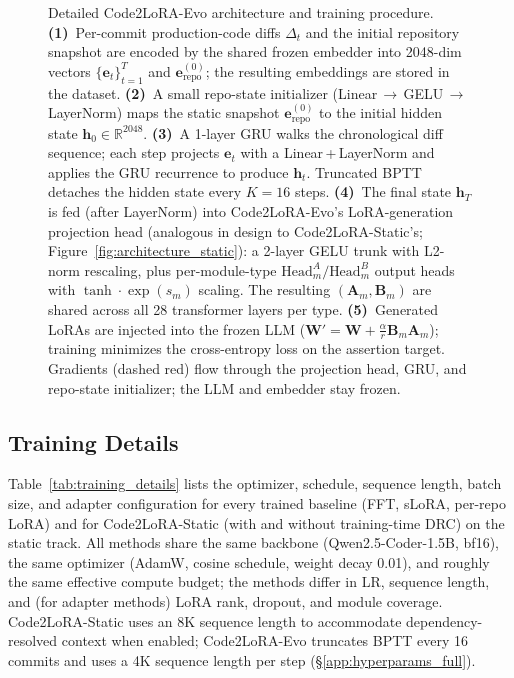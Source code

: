 \documentclass[11pt]{article}
\newcommand{\codelora}{Code2LoRA\xspace}
\newcommand{\codelorastatic}{\codelora-Static\xspace}
\newcommand{\codeloraevo}{\codelora-Evo\xspace}
\begin{document}
\begin{figure}[t]
\begin{center}
\caption{Detailed \codeloraevo{} architecture and training procedure.
\textbf{(1)}~Per-commit production-code diffs $\Delta_t$ and the initial repository snapshot are encoded by the shared frozen embedder into 2048-dim vectors $\{\mathbf{e}_t\}_{t=1}^T$ and $\mathbf{e}_{\text{repo}}^{(0)}$; the resulting embeddings are stored in the dataset.
\textbf{(2)}~A small repo-state initializer (Linear\,$\to$\,GELU\,$\to$\,LayerNorm) maps the static snapshot $\mathbf{e}_{\text{repo}}^{(0)}$ to the initial hidden state $\mathbf{h}_0\!\in\!\mathbb{R}^{2048}$.
\textbf{(3)}~A 1-layer GRU walks the chronological diff sequence; each step projects $\mathbf{e}_t$ with a Linear\,+\,LayerNorm and applies the GRU recurrence to produce $\mathbf{h}_t$. Truncated BPTT detaches the hidden state every $K{=}16$ steps.
\textbf{(4)}~The final state $\mathbf{h}_T$ is fed (after LayerNorm) into \codeloraevo{}'s LoRA-generation projection head (analogous in design to \codelorastatic{}'s; Figure~\ref{fig:architecture_static}): a 2-layer GELU trunk with L2-norm rescaling, plus per-module-type $\text{Head}^A_m / \text{Head}^B_m$ output heads with $\tanh\cdot\exp(s_m)$ scaling. The resulting $(\mathbf{A}_m, \mathbf{B}_m)$ are shared across all 28 transformer layers per type.
\textbf{(5)}~Generated LoRAs are injected into the frozen LLM ($\mathbf{W}' = \mathbf{W} + \tfrac{\alpha}{r}\mathbf{B}_m\mathbf{A}_m$); training minimizes the cross-entropy loss on the assertion target. Gradients (dashed red) flow through the projection head, GRU, and repo-state initializer; the LLM and embedder stay frozen.}
\label{fig:architecture_evo}
\end{center}
\end{figure}

\subsection{Training Details}
\label{app:training_details}

Table~\ref{tab:training_details} lists the optimizer, schedule, sequence length, batch size, and adapter configuration for every trained baseline (FFT, sLoRA, per-repo LoRA) and for \codelorastatic{} (with and without training-time DRC) on the static track.
All methods share the same backbone (Qwen2.5-Coder-1.5B, bf16), the same optimizer (AdamW, cosine schedule, weight decay 0.01), and roughly the same effective compute budget; the methods differ in LR, sequence length, and (for adapter methods) LoRA rank, dropout, and module coverage.
\codelorastatic{} uses an 8K sequence length to accommodate dependency-resolved context when enabled; \codeloraevo{} truncates BPTT every 16 commits and uses a 4K sequence length per step (\S\ref{app:hyperparams_full}).
\end{document}
